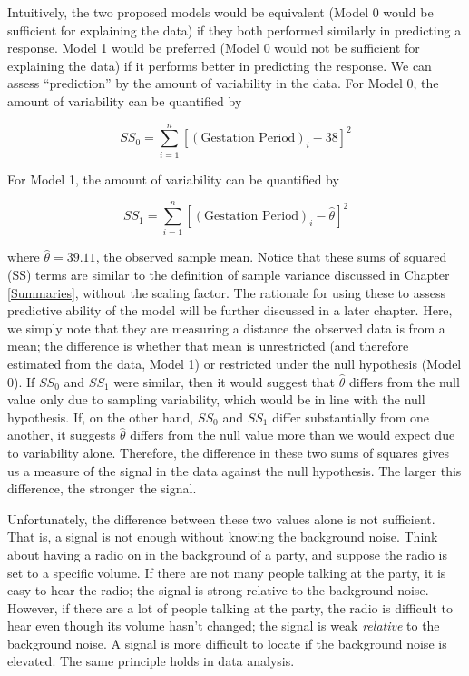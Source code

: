 \documentclass[]{book}
\theoremstyle{plain}
\theoremstyle{mydefn}
\theoremstyle{myexmpl}
\theoremstyle{remark}
\begin{document}
Intuitively, the two proposed models would be equivalent (Model 0 would
be sufficient for explaining the data) if they both performed similarly
in predicting a response. Model 1 would be preferred (Model 0 would not
be sufficient for explaining the data) if it performs better in
predicting the response. We can assess ``prediction'' by the amount of
variability in the data. For Model 0, the amount of variability can be
quantified by

\[SS_0 = \sum_{i=1}^{n} \left[(\text{Gestation Period})_i - 38\right]^2\]

For Model 1, the amount of variability can be quantified by

\[SS_1 = \sum_{i=1}^{n} \left[(\text{Gestation Period})_i - \widehat{\theta}\right]^2\]

where \(\widehat{\theta} = 39.11\), the observed sample mean. Notice
that these sums of squared (SS) terms are similar to the definition of
sample variance discussed in Chapter \ref{Summaries}, without the
scaling factor. The rationale for using these to assess predictive
ability of the model will be further discussed in a later chapter. Here,
we simply note that they are measuring a distance the observed data is
from a mean; the difference is whether that mean is unrestricted (and
therefore estimated from the data, Model 1) or restricted under the null
hypothesis (Model 0). If \(SS_0\) and \(SS_1\) were similar, then it
would suggest that \(\widehat{\theta}\) differs from the null value only
due to sampling variability, which would be in line with the null
hypothesis. If, on the other hand, \(SS_0\) and \(SS_1\) differ
substantially from one another, it suggests \(\widehat{\theta}\) differs
from the null value more than we would expect due to variability alone.
Therefore, the difference in these two sums of squares gives us a
measure of the signal in the data against the null hypothesis. The
larger this difference, the stronger the signal.

Unfortunately, the difference between these two values alone is not
sufficient. That is, a signal is not enough without knowing the
background noise. Think about having a radio on in the background of a
party, and suppose the radio is set to a specific volume. If there are
not many people talking at the party, it is easy to hear the radio; the
signal is strong relative to the background noise. However, if there are
a lot of people talking at the party, the radio is difficult to hear
even though its volume hasn't changed; the signal is weak
\emph{relative} to the background noise. A signal is more difficult to
locate if the background noise is elevated. The same principle holds in
data analysis.
\end{document}
